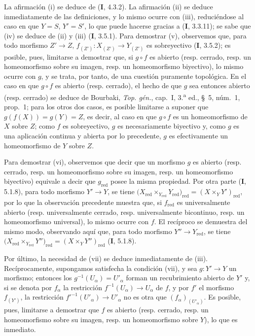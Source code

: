 La afirmación (i) se deduce de (\textbf I, 4.3.2). La afirmación (ii) se deduce
inmediatamente de las definiciones, y lo mismo ocurre con (iii), reduciéndose
al caso en que $Y=S$, $Y'=S'$, lo que puede hacerse gracias a (\textbf I, 3.3.11);
se sabe que (iv) se deduce de (ii) y (iii) (\textbf I, 3.5.1). Para demostrar (v),
observemos que, para todo morfismo $Z'\to Z$,
$f_{(Z')}:X_{(Z')}\to Y_{(Z')}$ es sobreyectivo
(\textbf I, 3.5.2); es posible, pues, limitarse a demostrar que, si $g\circ f$ es
abierto (resp. cerrado, resp. un
homeomorfismo sobre su imagen, resp. un homeomorfismo biyectivo), lo mismo
ocurre con $g$, y se trata, por tanto, de una cuestión puramente topológica.
En el caso en que $g\circ f$ es abierto (resp. cerrado), el hecho de que $g$
sea entonces abierto (resp. cerrado) se deduce de Bourbaki,
\emph{Top. gén.}, cap.~I, 3.\textsuperscript{a} ed., \S~5, núm.~1, prop.~1;
para los otros dos casos, es posible limitarse a suponer que
$g(f(X))=g(Y)=Z$, es decir, al caso en que $g\circ f$ es un homeomorfismo de
$X$ sobre $Z$; como $f$ es sobreyectivo, $g$ es necesariamente biyectivo y,
como $g$ es una aplicación continua y abierta por lo precedente, $g$ es
efectivamente un homeomorfismo de $Y$ sobre $Z$.

Para demostrar (vi), observemos que decir que un morfismo $g$ es abierto
(resp. cerrado, resp. un homeomorfismo sobre su imagen, resp. un
homeomorfismo biyectivo) equivale a decir que $g_{\mathrm{red}}$ posee la
misma propiedad. Por otra parte (\textbf I, 5.1.8), para todo morfismo $Y'\to Y$, se
tiene
$\bigl(X_{\mathrm{red}}\times_{Y_{\mathrm{red}}}Y_{\mathrm{red}}\bigr)_{\mathrm{red}}
=(X\times_Y Y')_{\mathrm{red}}$,
por lo que la observación precedente muestra que, si $f_{\mathrm{red}}$ es
universalmente abierto (resp. universalmente cerrado, resp. universalmente
bicontinuo, resp. un homeomorfismo universal), lo mismo ocurre con $f$. El
recíproco se demuestra del mismo modo, observando aquí que, para todo morfismo
$Y''\to Y_{\mathrm{red}}$, se tiene
$\bigl(X_{\mathrm{red}}\times_{Y_{\mathrm{red}}}Y''\bigr)_{\mathrm{red}}
=(X\times_Y Y'')_{\mathrm{red}}$
(\textbf{I}, 5.1.8).

Por último, la necesidad de (vii) se deduce inmediatamente de (iii).
Recíprocamente, supongamos satisfecha la condición (vii), y sea
$g:Y'\to Y$ un morfismo; entonces los
$g^{-1}(U_\alpha)=U'_\alpha$ forman un recubrimiento abierto de $Y'$ y, si
se denota por $f_\alpha$ la restricción
$f^{-1}(U_\alpha)\to U_\alpha$ de $f$, y por $f'$ el morfismo
$f_{(Y')}$, la restricción
$f'^{-1}(U'_\alpha)\to U'_\alpha$ no es otra que
$(f_\alpha)_{(U'_\alpha)}$. Es posible, pues, limitarse a demostrar que $f$ es
abierto (resp. cerrado, resp. un homeomorfismo sobre su imagen, resp. un
homeomorfismo sobre $Y$), lo que es inmediato.
